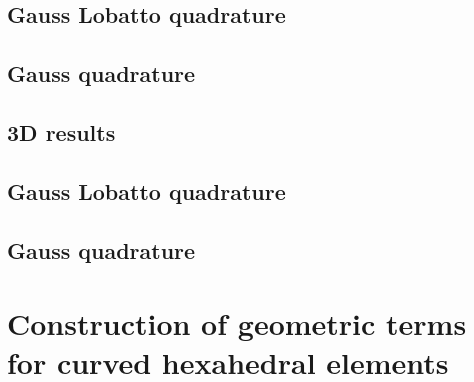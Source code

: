 \documentclass{svjour3}                     %
\begin{document}
\subsection{Gauss Lobatto quadrature}

\subsection{Gauss quadrature}

\subsection{3D results}
\subsection{Gauss Lobatto quadrature}

\subsection{Gauss quadrature}


\appendix

\section{Construction of geometric terms for curved hexahedral elements}
\label{app:A}





\end{document}
